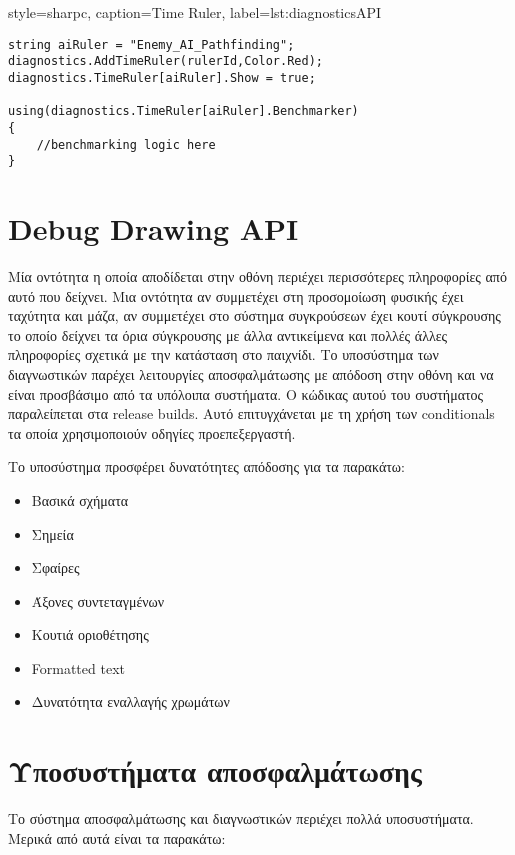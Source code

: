 \lstset
{
	style=sharpc, 
	caption={Time Ruler},
	label={lst:diagnosticsAPI}
}

\begin{lstlisting}
string aiRuler = "Enemy_AI_Pathfinding";
diagnostics.AddTimeRuler(rulerId,Color.Red);
diagnostics.TimeRuler[aiRuler].Show = true;

using(diagnostics.TimeRuler[aiRuler].Benchmarker)
{
	//benchmarking logic here
}
\end{lstlisting}

\section{Debug Drawing API}
Μία οντότητα η οποία αποδίδεται στην οθόνη περιέχει περισσότερες πληροφορίες από αυτό που δείχνει. Μια οντότητα αν συμμετέχει στη προσομοίωση φυσικής έχει ταχύτητα και μάζα, αν συμμετέχει στο σύστημα συγκρούσεων έχει κουτί σύγκρουσης το οποίο δείχνει τα όρια σύγκρουσης με άλλα αντικείμενα και πολλές άλλες πληροφορίες σχετικά με την κατάσταση στο παιχνίδι.
Το υποσύστημα των διαγνωστικών παρέχει λειτουργίες αποσφαλμάτωσης με απόδοση στην οθόνη και να είναι προσβάσιμο από τα υπόλοιπα συστήματα. Ο κώδικας αυτού του συστήματος παραλείπεται στα release builds. Αυτό επιτυγχάνεται με τη χρήση των conditionals τα οποία χρησιμοποιούν οδηγίες προεπεξεργαστή.

Το υποσύστημα προσφέρει δυνατότητες απόδοσης για τα παρακάτω:
\begin{itemize}
	\item Βασικά σχήματα
	\item Σημεία
	\item Σφαίρες
	\item Άξονες συντεταγμένων
	\item Κουτιά οριοθέτησης
	\item Formatted text
	\item Δυνατότητα εναλλαγής χρωμάτων
\end{itemize}

\section{Υποσυστήματα αποσφαλμάτωσης}
Το σύστημα αποσφαλμάτωσης και διαγνωστικών περιέχει πολλά υποσυστήματα. Μερικά από αυτά είναι τα παρακάτω:

